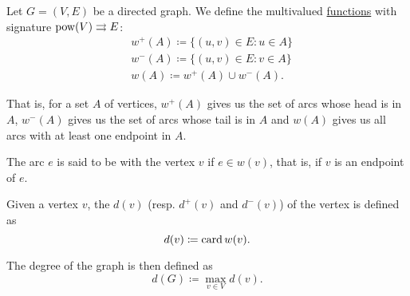 \begin{definition}\label{def:graph_incidence}
  Let \( G = (V, E) \) be a directed graph. We define the multivalued \hyperref[def:function/multivalued]{functions} with signature \( \operatorname{pow}(V) \rightrightarrows E \):
  \begin{align*}
     & w^+(A) \coloneqq \{ (u, v) \in E \colon u \in A \} \\
     & w^-(A) \coloneqq \{ (u, v) \in E \colon v \in A \} \\
     & w(A) \coloneqq w^+(A) \cup w^-(A).
  \end{align*}

  That is, for a set \( A \) of vertices, \( w^+(A) \) gives us the set of arcs whose head is in \( A \), \( w^-(A) \) gives us the set of arcs whose tail is in \( A \) and \( w(A) \) gives us all arcs with at least one endpoint in \( A \).

  \begin{DefEnum}
     The arc \( e \) is said to be  with the vertex \( v \) if \( e \in w(v) \), that is, if \( v \) is an endpoint of \( e \).

    Given a vertex \( v \), the  \( d(v) \) (resp.  \( d^+(v) \) and  \( d^-(v) \)) of the vertex is defined as
    \begin{equation*}
      d(v) \coloneqq \operatorname{card} w(v).
    \end{equation*}

    The degree of the graph is then defined as
    \begin{equation*}
      d(G) \coloneqq \max_{v \in V} d(v).
    \end{equation*}
  \end{DefEnum}
\end{definition}

